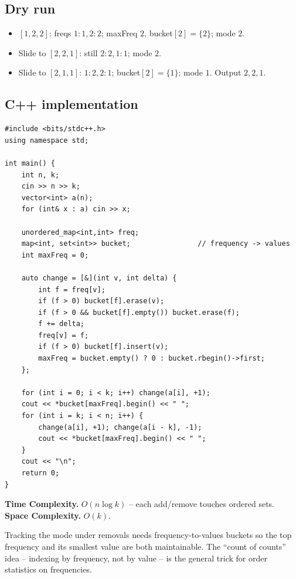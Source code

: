 \subsection*{Dry run}


\begin{itemize}
  \item $[1,2,2]$: freqs $1{:}1,2{:}2$; maxFreq $2$, bucket$[2]=\{2\}$;
        mode $2$.
  \item Slide to $[2,2,1]$: still $2{:}2,1{:}1$; mode $2$.
  \item Slide to $[2,1,1]$: $1{:}2,2{:}1$; bucket$[2]=\{1\}$; mode $1$.
        Output $2,2,1$.
\end{itemize}

\subsection*{C++ implementation}

\begin{lstlisting}
#include <bits/stdc++.h>
using namespace std;

int main() {
    int n, k;
    cin >> n >> k;
    vector<int> a(n);
    for (int& x : a) cin >> x;

    unordered_map<int,int> freq;
    map<int, set<int>> bucket;                // frequency -> values
    int maxFreq = 0;

    auto change = [&](int v, int delta) {
        int f = freq[v];
        if (f > 0) bucket[f].erase(v);
        if (f > 0 && bucket[f].empty()) bucket.erase(f);
        f += delta;
        freq[v] = f;
        if (f > 0) bucket[f].insert(v);
        maxFreq = bucket.empty() ? 0 : bucket.rbegin()->first;
    };

    for (int i = 0; i < k; i++) change(a[i], +1);
    cout << *bucket[maxFreq].begin() << " ";
    for (int i = k; i < n; i++) {
        change(a[i], +1); change(a[i - k], -1);
        cout << *bucket[maxFreq].begin() << " ";
    }
    cout << "\n";
    return 0;
}
\end{lstlisting}

\begin{complexitybox}
\textbf{Time Complexity.} $O(n\log k)$ -- each add/remove touches ordered
sets. \textbf{Space Complexity.} $O(k)$.
\end{complexitybox}

\begin{takeawaybox}
Tracking the mode under removals needs frequency-to-values buckets so the
top frequency and its smallest value are both maintainable. The ``count of
counts'' idea -- indexing by frequency, not by value -- is the general trick
for order statistics on frequencies.
\end{takeawaybox}
